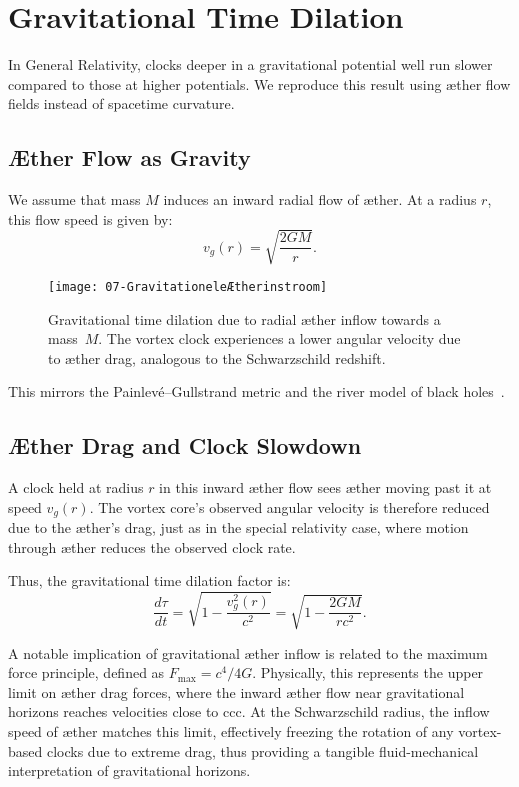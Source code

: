 \section{Gravitational Time Dilation}

In General Relativity, clocks deeper in a gravitational potential well run slower compared to those at higher potentials. We reproduce this result using æther flow fields instead of spacetime curvature.

\subsection*{Æther Flow as Gravity}

We assume that mass $M$ induces an inward radial flow of æther. At a radius $r$, this flow speed is given by:
\[
v_g(r) = \sqrt{\frac{2GM}{r}}.
\]

\begin{figure}[htbp]
    \centering
    \texttt{[image: 07-GravitationeleÆtherinstroom]}
    \caption{Gravitational time dilation due to radial æther inflow towards a mass~$M$. The vortex clock experiences a lower angular velocity due to æther drag, analogous to the Schwarzschild redshift.}
    \label{fig:GravitationeleÆtherinstroom}
\end{figure}

This mirrors the Painlevé–Gullstrand metric and the river model of black holes~\cite{Hamilton2004-river}.

\subsection*{Æther Drag and Clock Slowdown}

A clock held at radius $r$ in this inward æther flow sees æther moving past it at speed $v_g(r)$. The vortex core's observed angular velocity is therefore reduced due to the æther's drag, just as in the special relativity case, where motion through æther reduces the observed clock rate.

Thus, the gravitational time dilation factor is:
\[
\frac{d\tau}{dt} = \sqrt{1 - \frac{v_g^2(r)}{c^2}} = \sqrt{1 - \frac{2GM}{rc^2}}. \tag{4}
\]

A notable implication of gravitational æther inflow is related to the maximum force principle, defined as $F_\text{max} = c^4 /4G$. Physically, this represents the upper limit on æther drag forces, where the inward æther flow near gravitational horizons reaches velocities close to ccc. At the Schwarzschild radius, the inflow speed of æther matches this limit, effectively freezing the rotation of any vortex-based clocks due to extreme drag, thus providing a tangible fluid-mechanical interpretation of gravitational horizons.

